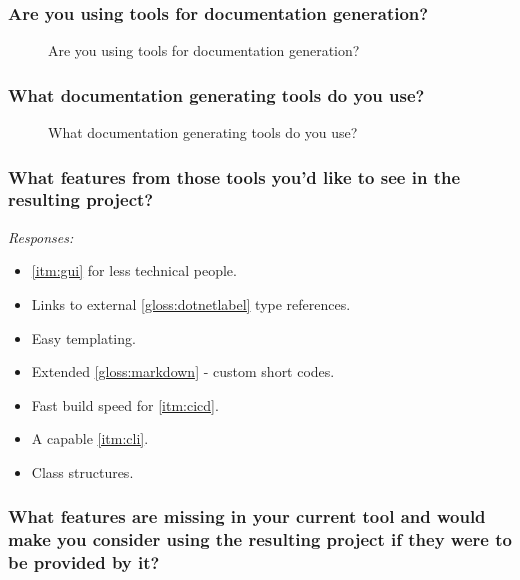 \subsubsection*{Are you using tools for documentation generation?}

\begin{figure}[H]
    \centering
    \caption{Are you using tools for documentation generation?}
    \label{fig:qUsingToolsForDocGen}
\end{figure}

\subsubsection*{What documentation generating tools do you use?}

\begin{figure}[H]
    \centering
    \caption{What documentation generating tools do you use?}
\end{figure}

\subsubsection*{What features from those tools you'd like to see in the resulting project?}

\textit{Responses:}
\begin{itemize}
    \item \ref{itm:gui} for less technical people.
    \item Links to external \ref{gloss:dotnetlabel} type references.
    \item Easy templating.
    \item Extended \ref{gloss:markdown} - custom short codes.
    \item Fast build speed for \ref{itm:cicd}.
    \item A capable \ref{itm:cli}.
    \item Class structures.
\end{itemize}

\subsubsection*{What features are missing in your current tool and would make you consider using the resulting project if they were to be provided by it?}

